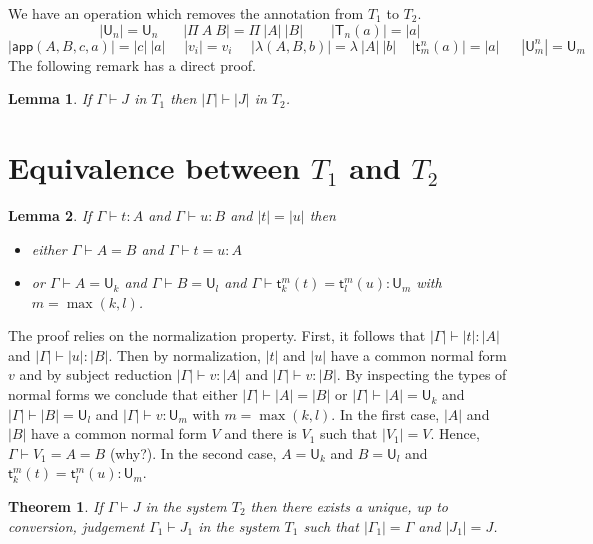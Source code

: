 \documentclass[11pt,a4paper]{article}
\newtheorem{theorem}{Theorem}[section]
\newtheorem{lemma}{Lemma}[theorem]
\theoremstyle{definition}
\def\UU{\mathsf{U}}
\newcommand{\LAM}{\lambda}
\newcommand{\APP}{\mathsf{app}}
\newcommand{\T}{\mathsf{T}}
\newcommand{\sT}{\mathsf{t}}
\begin{document}
\medskip

We have an operation which removes the annotation from $T_1$ to $T_2$.
$$
|\UU_n| = \UU_n~~~~~~~~|\Pi~A~B| = \Pi~|A|~|B|~~~~~~~~~|\T_n(a)| = |a|
$$
$$
|\APP(A,B,c,a)| = |c|~|a|~~~~~~|v_i| = v_i~~~~~~|\LAM(A,B,b)| = \lambda~|A|~|b|~~~~~|\sT_m^n(a)| = |a|
~~~~~~~|\UU^n_m| = \UU_m
$$
The following remark has a direct proof.

\begin{lemma}
  If $\Gamma\vdash J$ in $T_1$ then $|\Gamma|\vdash |J|$ in $T_2$.
\end{lemma}


\section{Equivalence between $T_1$ and $T_2$}



\begin{lemma}
  If $\Gamma\vdash t:A$ and $\Gamma\vdash u:B$ and $|t| = |u|$ then
  \begin{itemize}
    \item either $\Gamma\vdash A = B$
      and $\Gamma\vdash t = u:A$
    \item or $\Gamma\vdash A = \UU_k$ and $\Gamma\vdash B = \UU_l$ and $\Gamma\vdash \sT_k^m(t) = \sT_l^m(u):\UU_m$ with $m = \max(k,l)$.
  \end{itemize}
\end{lemma}

The proof relies on the normalization property. First, it follows that $|\Gamma | \vdash |t|:|A|$ and $|\Gamma | \vdash |u|:|B|$. Then by normalization, $| t |$ and $| u |$ have a common normal form $v$  and by subject reduction
$|\Gamma | \vdash v : |A|$ and $|\Gamma | \vdash v : |B|$. By inspecting the types of normal forms we conclude that either $|\Gamma | \vdash |A| = |B|$ or $|\Gamma | \vdash |A| = \UU_k$ and $|\Gamma | \vdash |B| = \UU_l$ and $|\Gamma | \vdash v :\UU_m$ with $m = \max(k,l)$. In the first case,  $|A|$ and $|B|$ have a common normal form $V$ and there is $V_1$ such that $| V_1 |  = V$. Hence, $\Gamma \vdash V_1 = A = B$ (why?). In the second case, $A = \UU_k$ and $B = \UU_l$ and $\sT_k^m(t) = \sT_l^m(u):\UU_m$.

\begin{theorem}
  If $\Gamma\vdash J$ in the system $T_2$ then there exists a unique, up to conversion, judgement $\Gamma_1\vdash J_1$
  in the system $T_1$ such that $|\Gamma_1| = \Gamma$ and $|J_1| = J$.
\end{theorem}
\end{document}
